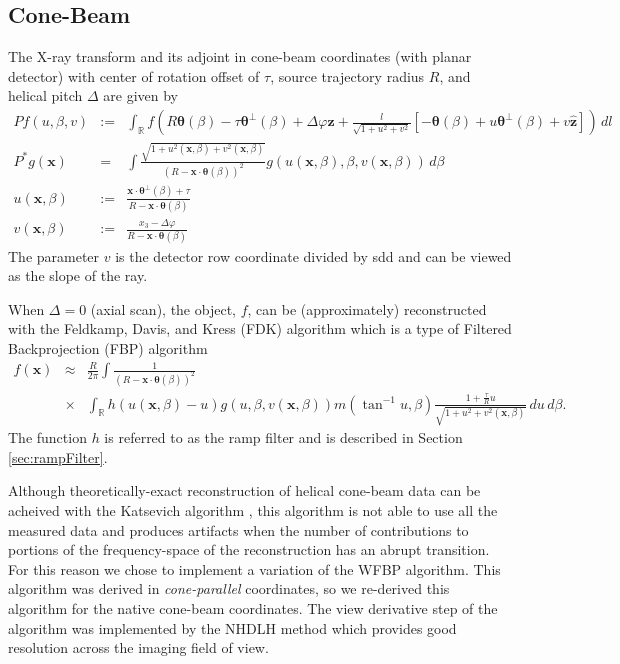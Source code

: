 \documentclass[11pt]{article}
\begin{document}



\subsection{Cone-Beam}

The X-ray transform and its adjoint in cone-beam coordinates (with planar detector) with center of rotation offset of $\tau$, source trajectory radius $R$, and helical pitch $\Delta$ are given by
\begin{eqnarray*}
Pf(u,\beta,v) &:=& \int_\mathbb{R} f\left(R\bm{\theta}(\beta) - \tau\bm{\theta}^\perp(\beta) + \Delta\varphi\widehat{\bm{z}}  + \frac{l}{\sqrt{1+u^2+v^2}}\left[-\bm{\theta}(\beta)+u\bm{\theta}^\perp(\beta) + v\widehat{\bm{z}} \right] \right) \, dl \\
P^*g(\bm{x}) &=& \int \frac{\sqrt{1+ u^2(\bm{x},\beta) +v^2(\bm{x},\beta)}}{(R-\bm{x}\cdot\bm{\theta}(\beta))^2} g\left( u(\bm{x},\beta), \beta, v(\bm{x},\beta)\right) \, d\beta \\
u(\bm{x},\beta) &:=& \frac{\bm{x}\cdot \bm{\theta}^\perp(\beta) + \tau}{R - \bm{x}\cdot\bm{\theta}(\beta)} \\
v(\bm{x},\beta) &:=& \frac{x_3 - \Delta\varphi}{R - \bm{x}\cdot\bm{\theta}(\beta)}
\end{eqnarray*}
The parameter $v$ is the detector row coordinate divided by sdd and can be viewed as the slope of the ray.

When $\Delta = 0$ (axial scan), the object, $f$, can be (approximately) reconstructed with the Feldkamp, Davis, and Kress (FDK) algorithm \cite{FDK} which is a type of Filtered Backprojection (FBP) algorithm
\begin{eqnarray*}
f(\bm{x}) &\approx& \frac{R}{2\pi} \int \frac{1}{(R-\bm{x}\cdot\bm{\theta}(\beta))^2} \\ &\times& \int_\mathbb{R} h(u(\bm{x},\beta) - u) g(u,\beta, v(\bm{x},\beta)) m(\tan^{-1}u,\beta) \frac{1+\frac{\tau}{R}u}{\sqrt{1+u^2+v^2(\bm{x},\beta)}} \, du \, d\beta.
\end{eqnarray*}
The function $h$ is referred to as the ramp filter and is described in Section \ref{sec:rampFilter}.

Although theoretically-exact reconstruction of helical cone-beam data can be acheived with the Katsevich algorithm \cite{Katsevich_SIAM_2002}, this algorithm is not able to use all the measured data and produces artifacts when the number of contributions to portions of the frequency-space of the reconstruction has an abrupt transition.  For this reason we chose to implement a variation of the WFBP \cite{WFBP} algorithm.  This algorithm was derived in \textit{cone-parallel} coordinates, so we re-derived this algorithm for the native cone-beam coordinates.  The view derivative step of the algorithm was implemented by the NHDLH \cite{NHDLH_PMB_2007} method which provides good resolution across the imaging field of view.
\end{document}

